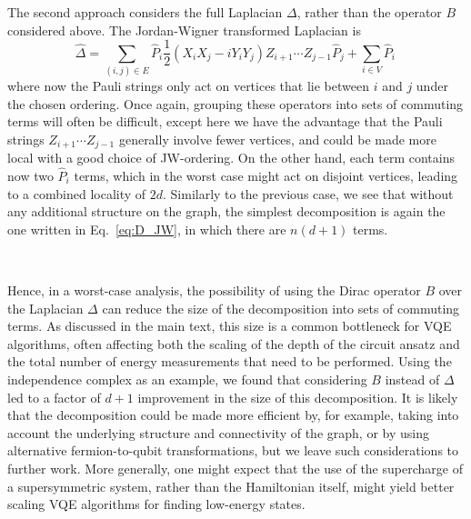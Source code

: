 \documentclass[11pt]{article}
\numberwithin{equation}{section}
\newcommand\equ[1] {\begin{equation}#1\end{equation}}
\renewcommand\( {\left(}
\renewcommand\) {\right)}
\begin{document}
The second approach considers the full Laplacian $\Delta$, rather than the operator $B$ considered above. The Jordan-Wigner transformed Laplacian is 
\equ{\label{eq:D_JW}
    \hat{\Delta} = \sum_{(i,j)\in E} \hat{P}_i \frac{1}{2}(X_iX_j - iY_iY_j) Z_{i+1}\cdots Z_{j-1} \hat{P}_j + \sum_{i\in V} \hat{P}_i\,
}
where now the Pauli strings only act on vertices that lie between $i$ and $j$ under the chosen ordering. Once again, grouping these operators into sets of commuting terms will often be difficult, except here we have the advantage that the Pauli strings $Z_{i+1}\cdots Z_{j-1}$ generally involve fewer vertices, and could be made more local with a good choice of JW-ordering. On the other hand, each term contains now two $\hat{P}_i$ terms, which in the worst case might act on disjoint vertices, leading to a combined locality of $2d$. Similarly to the previous case, we see that without any additional structure on the graph, the simplest decomposition is again the one written in Eq.~\eqref{eq:D_JW}, in which there are $n(d+1)$ terms. 

\ 

Hence, in a worst-case analysis, the possibility of using the Dirac operator $B$ over the Laplacian $\Delta$ can reduce the size of the decomposition into sets of commuting terms. As discussed in the main text, this size is a common bottleneck for VQE algorithms, often affecting both the scaling of the depth of the circuit ansatz and the total number of energy measurements that need to be performed. Using the independence complex as an example, we found that considering $B$ instead of $\Delta$ led to a factor of $d+1$ improvement in the size of this decomposition. It is likely that the decomposition could be made more efficient by, for example, taking into account the underlying structure and connectivity of the graph, or by using alternative fermion-to-qubit transformations, but we leave such considerations to further work. More generally, one might expect that the use of the supercharge of a supersymmetric system, rather than the Hamiltonian itself, might yield better scaling VQE algorithms for finding low-energy states.

 

\end{document}
